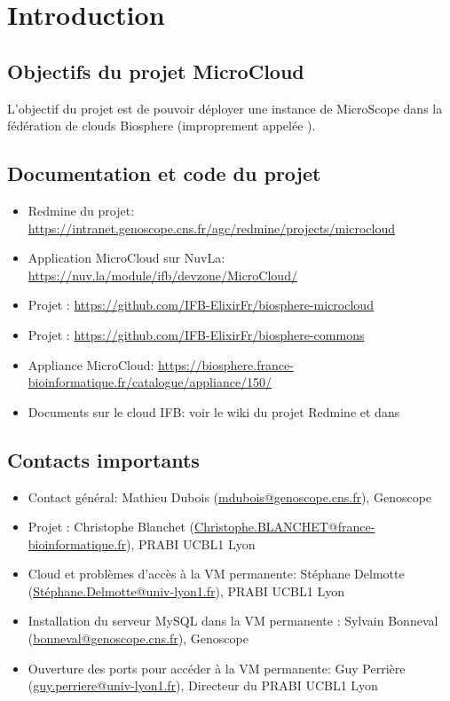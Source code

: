 \chapter{Introduction}

\section{Objectifs du projet MicroCloud}

L'objectif du projet est de pouvoir déployer une instance de MicroScope dans la fédération de clouds Biosphere (improprement appelée ).

\section{Documentation et code du projet}

\begin{itemize}
    \item Redmine du projet: \url{https://intranet.genoscope.cns.fr/agc/redmine/projects/microcloud}
    \item Application MicroCloud sur NuvLa: \url{https://nuv.la/module/ifb/devzone/MicroCloud/}
    \item Projet : \url{https://github.com/IFB-ElixirFr/biosphere-microcloud}
    \item Projet : \url{https://github.com/IFB-ElixirFr/biosphere-commons}
    \item Appliance MicroCloud: \url{https://biosphere.france-bioinformatique.fr/catalogue/appliance/150/}
    \item Documents sur le cloud IFB: voir le wiki du projet Redmine et dans 
\end{itemize}

\section{Contacts importants} \label{sec:contacts}

\begin{itemize}
    \item Contact général: Mathieu Dubois (\href{mailto:mdubois@genoscope.cns.fr}{mdubois@genoscope.cns.fr}), Genoscope
    \item Projet : Christophe Blanchet (\href{mailto:Christophe.BLANCHET@france-bioinformatique.fr}{Christophe.BLANCHET@france-bioinformatique.fr}), PRABI UCBL1 Lyon
    \item Cloud  et problèmes d'accès à la VM permanente: Stéphane Delmotte (\href{mailto:Stéphane.Delmotte@univ-lyon1.fr}{Stéphane.Delmotte@univ-lyon1.fr}), PRABI UCBL1 Lyon
    \item Installation du serveur MySQL dans la VM permanente : Sylvain Bonneval (\href{mailto:bonneval@genoscope.cns.fr}{bonneval@genoscope.cns.fr}), Genoscope
    \item Ouverture des ports pour accéder à la VM permanente: Guy Perrière (\href{mailto:guy.perriere@univ-lyon1.fr}{guy.perriere@univ-lyon1.fr}), Directeur du PRABI UCBL1 Lyon
\end{itemize}
